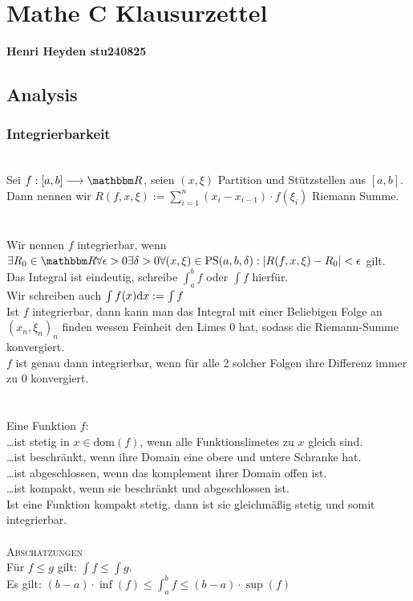


\section*{Mathe C Klausurzettel}
\textbf{Henri Heyden \gedanke stu240825}
\subsection*{Analysis}
\subsubsection*{Integrierbarkeit}
\\
Sei \(f : [a,b] \longrightarrow \R\), seien \((x, \xi)\) Partition und Stützstellen aus \([a,b]\).\\
Dann nennen wir \(R(f,x,\xi) := \sum_{i=1}^n (x_i - x_{i-1}) \cdot f(\xi_i)\) Riemann Summe. \\ \\
\\
Wir nennen \(f\) integrierbar, wenn\\\(\exists R_0 \in \R \forall \epsilon > 0 \exists \delta > 0 \forall(x,\xi) \in \text{PS}(a,b,\delta): |R(f,x,\xi) - R_0| < \epsilon\) gilt. \\
Das Integral ist eindeutig, schreibe \(\int_{a}^{b} f\) oder \(\int f\) hierfür. \\
Wir schreiben auch \(\int f(x)\text dx := \int f\) \\
Ist \(f\) integrierbar, dann kann man das Integral mit einer Beliebigen Folge an \((x_n,\xi_n)_n\) finden wessen Feinheit den Limes 0 hat, sodass die Riemann-Summe konvergiert. \\
\(f\) ist genau dann integrierbar, wenn für alle 2 solcher Folgen ihre Differenz immer zu 0 konvergiert. \\ \\
 \\
Eine Funktion \(f\): \\
\dots ist stetig in \(x \in \text{dom}(f)\), wenn alle Funktionslimetes zu \(x\) gleich sind.\\
\dots ist beschränkt, wenn ihre Domain eine obere und untere Schranke hat. \\
\dots ist abgeschlossen, wenn das komplement ihrer Domain offen ist. \\
\dots ist kompakt, wenn sie beschränkt und abgeschlossen ist. \\
Ist eine Funktion kompakt stetig, dann ist sie gleichmäßig stetig und somit integrierbar. \\ \\
\textsc{Abschätzungen} \\
Für \(f \le g\) gilt: \(\int f \le \int g\). \\
Es gilt: \((b-a) \cdot \inf(f) \le \int_{a}^{b}f \le (b-a) \cdot \sup(f)\)
